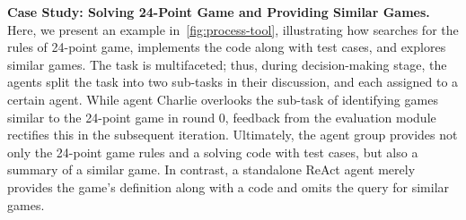 \textbf{Case Study: Solving 24-Point Game and Providing Similar Games.}
\label{sec:experiment-tool-case}
Here, we present an example in~\cref{fig:process-tool}, illustrating how \framework searches for the rules of 24-point game, implements the code along with test cases, and explores similar games. The task is multifaceted; thus, during decision-making stage, the agents split the task into two sub-tasks in their discussion, and each assigned to a certain agent. While agent Charlie overlooks the sub-task of identifying games similar to the 24-point game in round 0, feedback from the evaluation module rectifies this in the subsequent iteration. Ultimately, the agent group provides not only the 24-point game rules and a solving code with test cases, but also a summary of a similar game. In contrast, a standalone ReAct agent merely provides the game's definition along with a code and omits the query for similar games.





